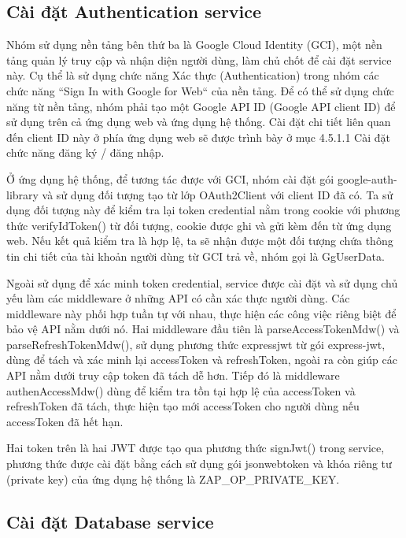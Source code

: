 \subsection{Cài đặt Authentication service}

\tab Nhóm sử dụng nền tảng bên thứ ba là Google Cloud Identity (GCI), một nền tảng quản lý truy cập và nhận diện người dùng, làm chủ chốt để cài đặt service này. Cụ thể là sử dụng chức năng Xác thực (Authentication) trong nhóm các chức năng “Sign In with Google for Web“ của nền tảng. Để có thể sử dụng chức năng từ nền tảng, nhóm phải tạo một Google API ID (Google API client ID) để sử dụng trên cả ứng dụng web và ứng dụng hệ thống. Cài đặt chi tiết liên quan đến client ID này ở phía ứng dụng web sẽ được trình bày ở mục 4.5.1.1 Cài đặt chức năng đăng ký / đăng nhập.
\par

Ở ứng dụng hệ thống, để tương tác được với GCI, nhóm cài đặt gói google-auth-library và sử dụng đối tượng tạo từ lớp OAuth2Client với client ID đã có. Ta sử dụng đối tượng này để kiểm tra lại token credential nằm trong cookie với phương thức verifyIdToken() từ đối tượng, cookie được ghi và gửi kèm đến từ ứng dụng web. Nếu kết quả kiểm tra là hợp lệ, ta sẽ nhận được một đối tượng chứa thông tin chi tiết của tài khoản người dùng từ GCI trả về, nhóm gọi là GgUserData.
\par

Ngoài sử dụng để xác minh token credential, service được cài đặt và sử dụng chủ yếu làm các middleware ở những API có cần xác thực người dùng. Các middleware này phối hợp tuần tự với nhau, thực hiện các công việc riêng biệt để bảo vệ API nằm dưới nó. Hai middleware đầu tiên là parseAccessTokenMdw() và parseRefreshTokenMdw(), sử dụng phương thức expressjwt từ gói express-jwt, dùng để tách và xác minh lại accessToken và refreshToken, ngoài ra còn giúp các API nằm dưới truy cập token đã tách dễ hơn. Tiếp đó là middleware authenAccessMdw() dùng để kiểm tra tồn tại hợp lệ của accessToken và refreshToken đã tách, thực hiện tạo mới accessToken cho người dùng nếu accessToken đã hết hạn.
\par

Hai token trên là hai JWT được tạo qua phương thức signJwt() trong service, phương thức được cài đặt bằng cách sử dụng gói jsonwebtoken và khóa riêng tư (private key) của ứng dụng hệ thống là ZAP\_OP\_PRIVATE\_KEY.

\subsection{Cài đặt Database service}

